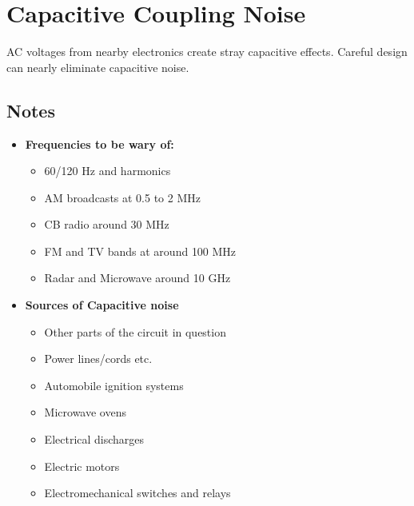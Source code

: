 \documentclass{../lab}
\begin{document}
\section{Capacitive Coupling Noise}

AC voltages from nearby electronics create stray capacitive effects. Careful design can nearly eliminate capacitive noise.

\subsection{Notes}

\begin{itemize}
    \item \textbf{Frequencies to be wary of:}
    \begin{itemize}
        \item 60/120 Hz and harmonics

        \item AM broadcasts at 0.5 to 2 MHz

        \item CB radio around 30 MHz

        \item FM and TV bands at around 100 MHz

        \item Radar and Microwave around 10 GHz

    \end{itemize}

    \item \textbf{Sources of Capacitive noise}
    \begin{itemize}
        \item Other parts of the circuit in question

        \item Power lines/cords etc.

        \item Automobile ignition systems

        \item Microwave ovens

        \item Electrical discharges

        \item Electric motors

        \item Electromechanical switches and relays

    \end{itemize}

\end{itemize}
\end{document}
